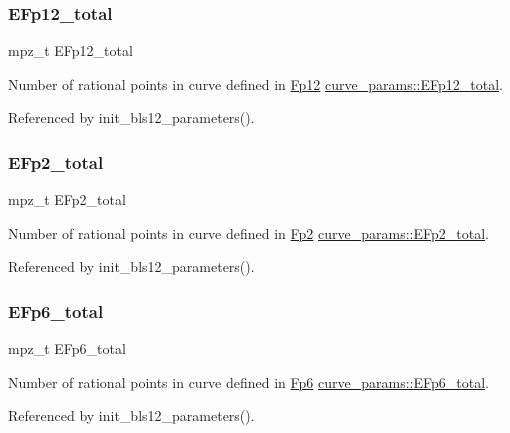 \subsubsection{\texorpdfstring{E\+Fp12\+\_\+total}{EFp12\_total}}
{\footnotesize\ttfamily mpz\+\_\+t E\+Fp12\+\_\+total}

Number of rational points in curve defined in \hyperlink{struct_fp12}{Fp12} \hyperlink{structcurve__params_a0bd24fe1a201e15d394f94b54fffed73}{curve\+\_\+params\+::\+E\+Fp12\+\_\+total}. 

Referenced by init\+\_\+bls12\+\_\+parameters().

\mbox{\label{structcurve__params_a41f2c250bbb645f79e140a0cc74841ce}} 
\subsubsection{\texorpdfstring{E\+Fp2\+\_\+total}{EFp2\_total}}
{\footnotesize\ttfamily mpz\+\_\+t E\+Fp2\+\_\+total}

Number of rational points in curve defined in \hyperlink{struct_fp2}{Fp2} \hyperlink{structcurve__params_a41f2c250bbb645f79e140a0cc74841ce}{curve\+\_\+params\+::\+E\+Fp2\+\_\+total}. 

Referenced by init\+\_\+bls12\+\_\+parameters().

\mbox{\label{structcurve__params_a648289a78c013a2fa6cb7411f4feadce}} 
\subsubsection{\texorpdfstring{E\+Fp6\+\_\+total}{EFp6\_total}}
{\footnotesize\ttfamily mpz\+\_\+t E\+Fp6\+\_\+total}

Number of rational points in curve defined in \hyperlink{struct_fp6}{Fp6} \hyperlink{structcurve__params_a648289a78c013a2fa6cb7411f4feadce}{curve\+\_\+params\+::\+E\+Fp6\+\_\+total}. 

Referenced by init\+\_\+bls12\+\_\+parameters().

\mbox{\label{structcurve__params_a6bf91dafda4f4779069da69efe4a7550}} 
